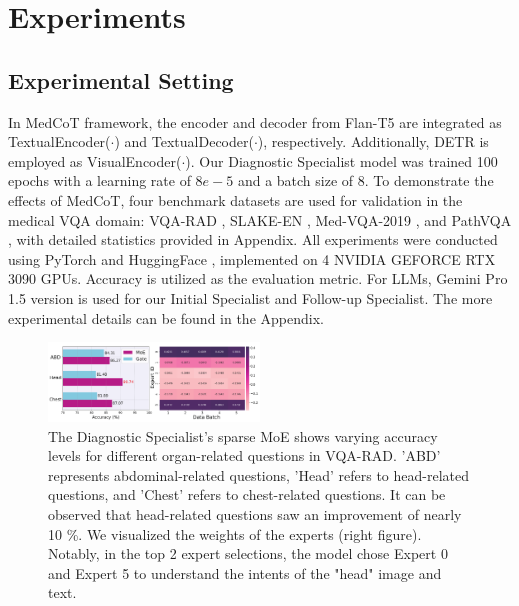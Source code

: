 \documentclass[11pt]{article}
\begin{document}
\section{Experiments}

\subsection{Experimental Setting}
In MedCoT framework, the encoder and decoder from Flan-T5 \cite{khashabi2020unifiedqa,raffel2020exploring} are integrated as TextualEncoder($\cdot$) and TextualDecoder($\cdot$), respectively. Additionally, DETR \cite{carion2020end} is employed as VisualEncoder($\cdot$). 
Our Diagnostic Specialist model was trained 100 epochs with a learning rate of $8e-5$ and a batch size of 8. 
To demonstrate the effects of MedCoT, four benchmark datasets are used for validation in the medical VQA domain: VQA-RAD \cite{lau2018dataset}, SLAKE-EN \cite{liu2021slake}, Med-VQA-2019 \cite{abacha2019vqa}, and PathVQA \cite{he2020pathvqa}, with detailed statistics provided in Appendix. 
All experiments were conducted using PyTorch \cite{paszke2019pytorch} and HuggingFace \cite{wolf2020transformers}, implemented on 4 NVIDIA GEFORCE RTX 3090 GPUs. Accuracy is utilized as the evaluation metric. 
For LLMs, Gemini Pro 1.5 version is used for our Initial Specialist and Follow-up Specialist. The more experimental details can be found in the Appendix.


\begin{figure}
\centering
\includegraphics[width=0.5\textwidth]{image/RAD-v4.pdf}
\caption{
The Diagnostic Specialist's sparse MoE shows varying accuracy levels for different organ-related questions in VQA-RAD. 
'ABD' represents abdominal-related questions, 'Head' refers to head-related questions, and 'Chest' refers to chest-related questions.
It can be observed that head-related questions saw an improvement of nearly 10 \%. We visualized the weights of the experts (right figure). Notably, in the top 2 expert selections, the model chose Expert 0 and Expert 5 to understand the intents of the "head" image and text. 
} 
\label{rad}
\end{figure}
\end{document}
